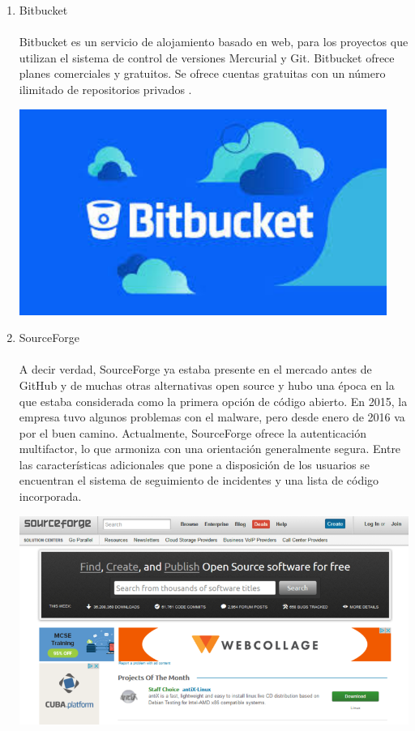 \begin{enumerate}[1.]
	\item Bitbucket
	\\
	\\Bitbucket es un servicio de alojamiento basado en web, para los proyectos que utilizan el sistema de control de versiones Mercurial y Git. Bitbucket ofrece planes comerciales y gratuitos. Se ofrece cuentas gratuitas con un número ilimitado de repositorios privados .



	\begin{center}
	\includegraphics[width=12cm]{./Imagenes/git3} 
	\end{center}


\item SourceForge
	\\
	\\A decir verdad, SourceForge ya estaba presente en el mercado antes de GitHub y de muchas otras alternativas open source y hubo una época en la que estaba considerada como la primera opción de código abierto. En 2015, la empresa tuvo algunos problemas con el malware, pero desde enero de 2016 va por el buen camino. Actualmente, SourceForge ofrece la autenticación multifactor, lo que armoniza con una orientación generalmente segura. Entre las características adicionales que pone a disposición de los usuarios se encuentran el sistema de seguimiento de incidentes y una lista de código incorporada.

	\begin{center}
	\includegraphics[width=15cm]{./Imagenes/git4} 
	\end{center}



\end{enumerate}
